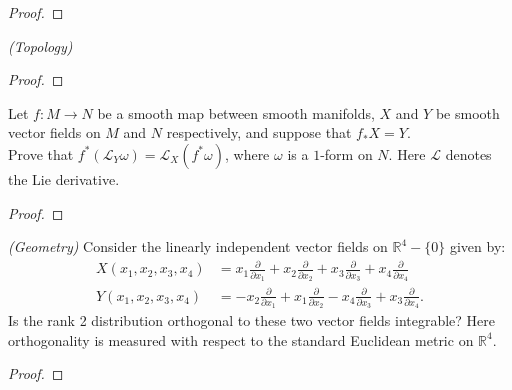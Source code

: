 \documentclass{article}
\newenvironment{problem}[2][Problem]{\begin{trivlist}
\item[\hskip \labelsep {\bfseries #1}\hskip \labelsep {\bfseries #2.}]}{\end{trivlist}}
\begin{document}
\begin{proof}
\end{proof}

\pagebreak

\begin{problem}{5} \textit{(Topology)}
\end{problem}

\begin{proof}
\end{proof}

\pagebreak

\begin{problem}{6}
  Let $f\colon M \rightarrow N$ be a smooth map between smooth manifolds, $X$
  and $Y$ be smooth vector fields on $M$ and $N$ respectively, and suppose that
  $f_*X = Y$. \\
  Prove that $f^*(\mathcal{L}_Y\omega) = \mathcal{L}_X(f^*\omega)$, where
  $\omega$ is a $1$-form on $N$. Here $\mathcal{L}$ denotes the Lie derivative.
\end{problem}

\begin{proof}
\end{proof}

\pagebreak

\begin{problem}{7} \textit{(Geometry)}
  Consider the linearly independent vector fields on $\mathbb{R}^4 - \{ 0 \}$
  given by: \begin{align*}
    X(x_1, x_2, x_3, x_4)
      &= x_1 \frac{\partial}{\partial x_1}
      + x_2 \frac{\partial}{\partial x_2}
      + x_3 \frac{\partial}{\partial x_3}
      + x_4 \frac{\partial}{\partial x_4} \\
    Y(x_1, x_2, x_3, x_4)
      &= -x_2 \frac{\partial}{\partial x_1}
      + x_1 \frac{\partial}{\partial x_2}
      - x_4 \frac{\partial}{\partial x_3}
      + x_3 \frac{\partial}{\partial x_4}.
  \end{align*}
  Is the rank 2 distribution orthogonal to these two vector fields integrable?
  Here orthogonality is measured with respect to the standard Euclidean metric
  on $\mathbb{R}^4$.
\end{problem}

\begin{proof}
\end{proof}
\end{document}
